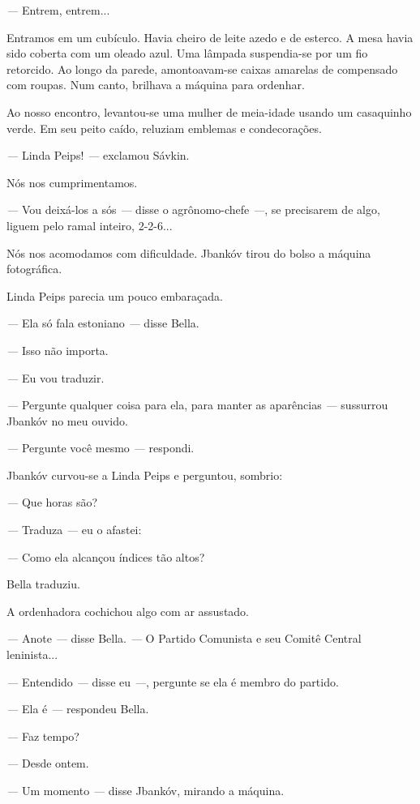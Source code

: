 \emph{---} Entrem, entrem...

Entramos em um cubículo. Havia cheiro de leite azedo e de esterco. A
mesa havia sido coberta com um oleado azul. Uma lâmpada suspendia-se por
um fio retorcido. Ao longo da parede, amontoavam-se caixas amarelas de
compensado com roupas. Num canto, brilhava a máquina para ordenhar.

Ao nosso encontro, levantou-se uma mulher de meia-idade usando um
casaquinho verde. Em seu peito caído, reluziam emblemas e condecorações.

\emph{---} Linda Peips! \emph{---} exclamou Sávkin.

Nós nos cumprimentamos.

\emph{---} Vou deixá-los a sós \emph{---} disse o agrônomo-chefe
\emph{---}, se precisarem de algo, liguem pelo ramal inteiro, 2-2-6...

Nós nos acomodamos com dificuldade. Jbankóv tirou do bolso a máquina
fotográfica.

Linda Peips parecia um pouco embaraçada.

\emph{---} Ela só fala estoniano \emph{---} disse Bella.

\emph{---} Isso não importa.

\emph{---} Eu vou traduzir.

\emph{---} Pergunte qualquer coisa para ela, para manter as aparências
\emph{---} sussurrou Jbankóv no meu ouvido.

\emph{---} Pergunte você mesmo \emph{---} respondi.

Jbankóv curvou-se a Linda Peips e perguntou, sombrio:

\emph{---} Que horas são?

\emph{---} Traduza \emph{---} eu o afastei:

\emph{---} Como ela alcançou índices tão altos?

Bella traduziu.

A ordenhadora cochichou algo com ar assustado.

\emph{---} Anote \emph{---} disse Bella. \emph{---} O Partido Comunista
e seu Comitê Central leninista...

\emph{---} Entendido \emph{---} disse eu \emph{---}, pergunte se ela é
membro do partido.

\emph{---} Ela é \emph{---} respondeu Bella.

\emph{---} Faz tempo?

\emph{---} Desde ontem.

\emph{---} Um momento \emph{---} disse Jbankóv, mirando a máquina.

